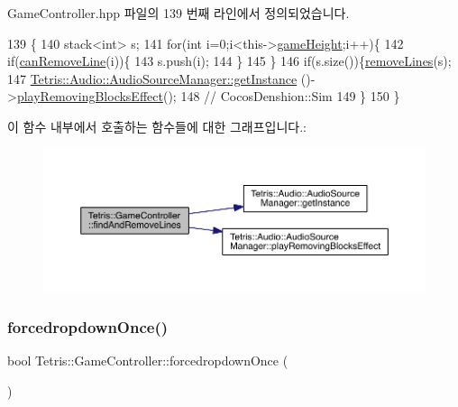 Game\+Controller.\+hpp 파일의 139 번째 라인에서 정의되었습니다.


\begin{DoxyCode}
139                                      \{
140                 stack<int> s;
141                 \textcolor{keywordflow}{for}(\textcolor{keywordtype}{int} i=0;i<this->\hyperlink{class_tetris_1_1_game_controller_a8e3adc647ed382de0ff541417bea9b33}{gameHeight};i++)\{
142                     \textcolor{keywordflow}{if}(\hyperlink{class_tetris_1_1_game_controller_a912bb473994e869a610ab356086cb0ad}{canRemoveLine}(i))\{
143                         s.push(i);
144                     \}
145                 \}
146                 \textcolor{keywordflow}{if}(s.size())\{\hyperlink{class_tetris_1_1_game_controller_aa95d44d0084ac5537f1c753796df4565}{removeLines}(s);
147                     \hyperlink{class_tetris_1_1_audio_1_1_audio_source_manager_a561c580924ee6a13e6453b2d94764548}{Tetris::Audio::AudioSourceManager::getInstance}
      ()->\hyperlink{class_tetris_1_1_audio_1_1_audio_source_manager_a44c761f0200291a2c8f282d8d52aa081}{playRemovingBlocksEffect}();
148                    \textcolor{comment}{// CocosDenshion::Sim}
149                 \}
150             \}
\end{DoxyCode}
이 함수 내부에서 호출하는 함수들에 대한 그래프입니다.\+:
\nopagebreak
\begin{figure}[H]
\begin{center}
\leavevmode
\includegraphics[width=350pt]{db/dd2/class_tetris_1_1_game_controller_ab19e8563acc9e724e130de60f87600b7_cgraph}
\end{center}
\end{figure}
\mbox{\label{class_tetris_1_1_game_controller_a035e352a85db58a05322156af606f0fa}} 
\subsubsection{\texorpdfstring{forcedropdown\+Once()}{forcedropdownOnce()}}
{\footnotesize\ttfamily bool Tetris\+::\+Game\+Controller\+::forcedropdown\+Once (\begin{DoxyParamCaption}{ }\end{DoxyParamCaption})\hspace{0.3cm}{\ttfamily [inline]}}

